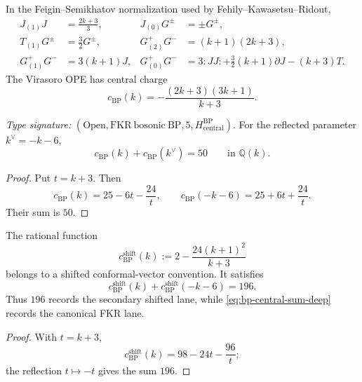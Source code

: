 \begin{proposition}
\label{prop:bp-ope-deep}
\ClaimStatusProvedElsewhere
In the Feigin--Semikhatov normalization used by
Fehily--Kawasetsu--Ridout,
\begin{align*}
J_{(1)}J&=\frac{2k+3}{3},&
J_{(0)}G^\pm&=\pm G^\pm,\\
T_{(1)}G^\pm&=\frac32G^\pm,&
G^+_{(2)}G^-&=(k+1)(2k+3),\\
G^+_{(1)}G^-&=3(k+1)J,&
G^+_{(0)}G^-&=
3{:}JJ{:}+\frac32(k+1)\partial J-(k+3)T.
\end{align*}
The Virasoro OPE has central charge
\begin{equation}
\label{eq:bp-central-deep}
c_{\mathrm{BP}}(k)
=-\frac{(2k+3)(3k+1)}{k+3}.
\end{equation}
\end{proposition}

\begin{theorem}
\label{thm:bp-central-companion-deep}
\ClaimStatusProvedHere
\emph{Type signature:}
\((\mathrm{Open},\mathrm{FKR\ bosonic\ BP},5,
H_{\mathrm{central}}^{\mathrm{BP}})\).
For the reflected parameter \(k^\vee=-k-6\),
\begin{equation}
\label{eq:bp-central-sum-deep}
c_{\mathrm{BP}}(k)+c_{\mathrm{BP}}(k^\vee)=50
\qquad\text{in }\mathbb Q(k).
\end{equation}
\end{theorem}

\begin{proof}
Put \(t=k+3\).  Then
\[
c_{\mathrm{BP}}(k)=25-6t-\frac{24}{t},
\qquad
c_{\mathrm{BP}}(-k-6)=25+6t+\frac{24}{t}.
\]
Their sum is \(50\).
\end{proof}

\begin{proposition}
\label{prop:bp-shifted-secondary-deep}
\ClaimStatusComputed
The rational function
\[
c_{\mathrm{BP}}^{\mathrm{shift}}(k)
:=2-\frac{24(k+1)^2}{k+3}
\]
belongs to a shifted conformal-vector convention.  It satisfies
\[
c_{\mathrm{BP}}^{\mathrm{shift}}(k)
+c_{\mathrm{BP}}^{\mathrm{shift}}(-k-6)=196.
\]
Thus \(196\) records the secondary shifted lane, while
\eqref{eq:bp-central-sum-deep} records the canonical FKR lane.
\end{proposition}

\begin{proof}
With \(t=k+3\),
\[
c_{\mathrm{BP}}^{\mathrm{shift}}(k)
=98-24t-\frac{96}{t};
\]
the reflection \(t\mapsto-t\) gives the sum \(196\).
\end{proof}

